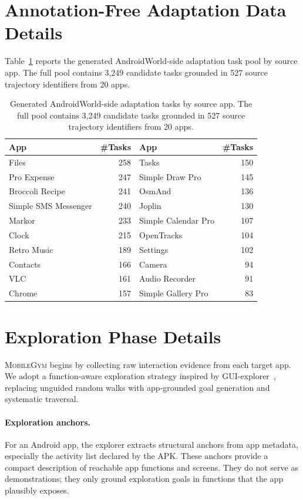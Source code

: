 \documentclass{llmxive}
\providecommand{\mobilegym}{\textsc{MobileGym}\xspace}
\providecommand{\paperTable}{  \small
  \setlength{\tabcolsep}{4.5pt}  \renewcommand{\arraystretch}{1.12}}
\begin{document}
\section{Annotation-Free Adaptation Data Details}
\label{sec:appendix_data_details}

Table~\ref{tab:generated_task_corpus} reports the generated AndroidWorld-side adaptation task pool by source app. The full pool contains 3,249 candidate tasks grounded in 527 source trajectory identifiers from 20 apps.

\begin{table}[!htbp]
\centering
\paperTable
\begin{tabular}{@{}l r@{\qquad\qquad}l r@{}}
\toprule
\textbf{App} & \textbf{\#Tasks} & \textbf{App} & \textbf{\#Tasks} \\
\midrule
Files & 258 & Tasks & 150 \\
Pro Expense & 247 & Simple Draw Pro & 145 \\
Broccoli Recipe & 241 & OsmAnd & 136 \\
Simple SMS Messenger & 240 & Joplin & 130 \\
Markor & 233 & Simple Calendar Pro & 107 \\
Clock & 215 & OpenTracks & 104 \\
Retro Music & 189 & Settings & 102 \\
Contacts & 166 & Camera & 94 \\
VLC & 161 & Audio Recorder & 91 \\
Chrome & 157 & Simple Gallery Pro & 83 \\
\bottomrule
\end{tabular}
\caption{Generated AndroidWorld-side adaptation tasks by source app. The full pool contains 3,249 candidate tasks grounded in 527 source trajectory identifiers from 20 apps.}
\label{tab:generated_task_corpus}
\end{table}


\section{Exploration Phase Details}
\label{sec:exploration_details}

\mobilegym begins by collecting raw interaction evidence from each target app. We adopt a function-aware exploration strategy inspired by GUI-explorer~\citep{xie2025gui}, replacing unguided random walks with app-grounded goal generation and systematic traversal.

\paragraph{Exploration anchors.}
For an Android app, the explorer extracts structural anchors from app metadata, especially the activity list declared by the APK. These anchors provide a compact description of reachable app functions and screens. They do not serve as demonstrations; they only ground exploration goals in functions that the app plausibly exposes.
\end{document}
